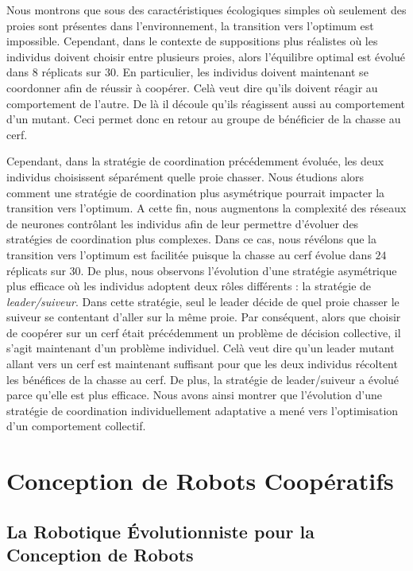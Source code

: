 			Nous montrons que sous des caractéristiques écologiques simples où seulement des proies sont présentes dans l'environnement, la transition vers l'optimum est impossible. Cependant, dans le contexte de suppositions plus réalistes où les individus doivent choisir entre plusieurs proies, alors l'équilibre optimal est évolué dans $8$ réplicats sur $30$. En particulier, les individus doivent maintenant se coordonner afin de réussir à coopérer. Celà veut dire qu'ils doivent réagir au comportement de l'autre. De là il découle qu'ils réagissent aussi au comportement d'un mutant. Ceci permet donc en retour au groupe de bénéficier de la chasse au cerf.

			Cependant, dans la stratégie de coordination précédemment évoluée, les deux individus choisissent séparément quelle proie chasser. Nous étudions alors comment une stratégie de coordination plus asymétrique pourrait impacter la transition vers l'optimum. A cette fin, nous augmentons la complexité des réseaux de neurones contrôlant les individus afin de leur permettre d'évoluer des stratégies de coordination plus complexes. Dans ce cas, nous révélons que la transition vers l'optimum est facilitée puisque la chasse au cerf évolue dans $24$ réplicats sur $30$. De plus, nous observons l'évolution d'une stratégie asymétrique plus efficace où les individus adoptent deux rôles différents : la stratégie de \emph{leader/suiveur}. Dans cette stratégie, seul le leader décide de quel proie chasser le suiveur se contentant d'aller sur la même proie. Par conséquent, alors que choisir de coopérer sur un cerf était précédemment un problème de décision collective, il s'agit maintenant d'un problème individuel. Celà veut dire qu'un leader mutant allant vers un cerf est maintenant suffisant pour que les deux individus récoltent les bénéfices de la chasse au cerf. De plus, la stratégie de leader/suiveur a évolué parce qu'elle est plus efficace. Nous avons ainsi montrer que l'évolution d'une stratégie de coordination individuellement adaptative a mené vers l'optimisation d'un comportement collectif.



\section{Conception de Robots Coopératifs}

	\subsection{La Robotique Évolutionniste pour la Conception de Robots}

